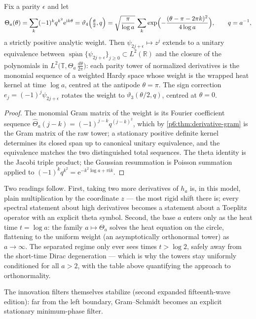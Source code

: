 \documentclass[11pt,oneside]{article}
\numberwithin{equation}{section}
\theoremstyle{definition}
\theoremstyle{remark}
\newcommand{\R}{\mathbb R}
\newcommand{\e}{\mathrm e}
\newcommand{\ii}{\mathrm i}
\begin{document}
\begin{proposition}
\label{p6:prop:circle-model}
Fix a parity $\epsilon$ and let
\[
 \Theta_a(\theta)
 =\sum_{k}(-1)^kq^{k^2}\e^{\ii k\theta}
 =\vartheta_4\Bigl(\tfrac\theta2,q\Bigr)
 =\sqrt{\frac{\pi}{\log a}}\,
 \sum_{k}\exp\Bigl(-\frac{(\theta-\pi-2\pi k)^2}{4\log a}\Bigr),
 \qquad q=a^{-1},
\]
a strictly positive analytic weight.  Then $\psi_{2j+\epsilon}\mapsto z^j$
extends to a unitary equivalence between
$\overline{\operatorname{span}}\{\psi_{2j+\epsilon}\}_{j\ge0}\subset L^2(\R)$
and the closure of the polynomials in
$L^2\bigl(\mathbb T,\Theta_a\,\frac{d\theta}{2\pi}\bigr)$: each parity tower
of normalized derivatives is the monomial sequence of a weighted Hardy space
whose weight is the wrapped heat kernel at time $\log a$, centred at the
antipode $\theta=\pi$.  The sign correction $e_j=(-1)^j\psi_{2j+\epsilon}$
rotates the weight to $\vartheta_3(\theta/2,q)$, centred at $\theta=0$.
\end{proposition}

\begin{proof}
The monomial Gram matrix of the weight is its Fourier coefficient sequence
$\widehat\Theta_a(j-k)=(-1)^{j-k}q^{(j-k)^2}$, which by
\cref{p6:thm:derivative-gram} is the Gram matrix of the raw tower; a
stationary positive definite kernel determines its closed span up to
canonical unitary equivalence, and the equivalence matches the two
distinguished total sequences.  The theta identity is the Jacobi triple
product; the Gaussian resummation is Poisson summation applied to
$(-1)^kq^{k^2}=\e^{-k^2\log a+\pi\ii k}$.
\end{proof}

Two readings follow.  First, taking two more derivatives of $h_a$ is, in
this model, plain multiplication by the coordinate $z$ --- the most rigid
shift there is; every spectral statement about high derivatives becomes a
statement about a Toeplitz operator with an explicit theta symbol.  Second,
the base $a$ enters only as the heat time $t=\log a$: the family
$a\mapsto\Theta_a$ solves the heat equation on the circle, flattening to the
uniform weight (an asymptotically orthonormal tower) as $a\to\infty$.  The
separated regime only ever sees times $t>\log2$, safely away from the
short-time Dirac degeneration --- which is why the towers stay uniformly
conditioned for all $a>2$, with the table above quantifying the approach to
orthonormality.

The innovation filters themselves stabilize (second expanded
fifteenth-wave edition): far from the left boundary, Gram--Schmidt becomes
an explicit stationary minimum-phase filter.
\end{document}
